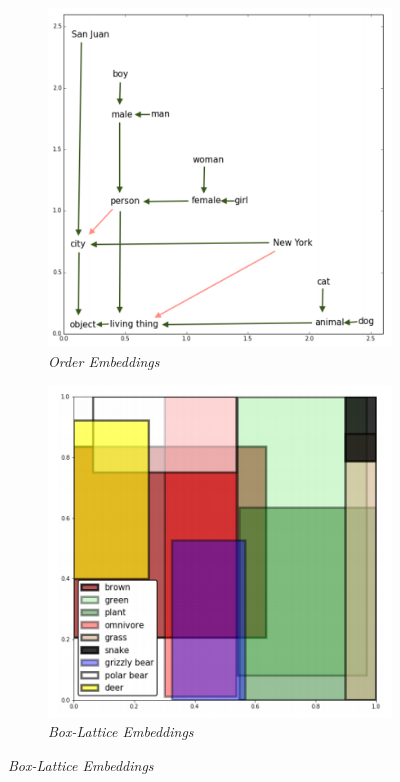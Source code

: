 \begin{figure}[h]
    \begin{subfigure}{.32\textwidth}
          \centering
          \includegraphics[width=.8\linewidth]{img/emb-orderemb.png}  
          \caption{\textit{Order Embeddings}}
          \label{subfig:orderemb}
    \end{subfigure}
    \begin{subfigure}{.33\textwidth}
          \centering
          \includegraphics[width=.8\linewidth]{img/emb-boxlattice.png}  
          \caption{\textit{Box-Lattice Embeddings}}
          \label{subfig:boxlatticeemb}

\end{subfigure}
\end{figure}
